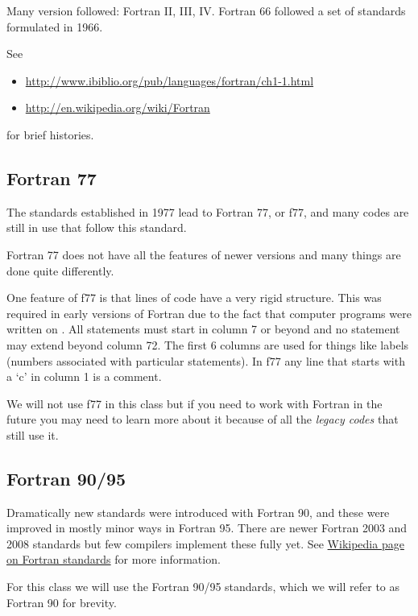 \documentclass[letterpaper,10pt,english]{sphinxmanual}
\begin{document}
Many version followed: Fortran II, III, IV. Fortran 66
followed a set of standards formulated in 1966.

See
\begin{itemize}
\item {} 
\url{http://www.ibiblio.org/pub/languages/fortran/ch1-1.html}

\item {} 
\url{http://en.wikipedia.org/wiki/Fortran}

\end{itemize}

for brief histories.


\subsection{Fortran 77}
\label{fortran:fortran-77}
The standards established in 1977 lead to Fortran 77, or f77, and
many codes are still in use that follow this standard.

Fortran 77 does not have all the features of newer versions and many
things are done quite differently.

One feature of f77 is that lines of code have a very rigid structure.
This was required in early versions of Fortran due to the fact that
computer programs were written on {\hyperref[punchcard:punchcard]{}}.  All statements
must start in column 7 or beyond and no statement may extend beyond
column 72. The first 6 columns are used for things like labels
(numbers associated with particular statements).  In f77 any line
that starts with a `c' in column 1 is a comment.

We will not use f77 in this class but if you need to work with
Fortran in the future you may need to learn more about it because of
all the \emph{legacy codes} that still use it.


\subsection{Fortran 90/95}
\label{fortran:fortran-90-95}
Dramatically new standards were introduced with Fortran 90, and these
were improved in mostly minor ways in Fortran 95.  There are newer
Fortran 2003 and 2008 standards but few compilers implement these fully yet.
See \href{http://gcc.gnu.org/wiki/GFortranStandards}{Wikipedia page on Fortran standards}
for more information.

For this class we will use the Fortran 90/95 standards, which we will
refer to as Fortran 90 for brevity.
\end{document}

